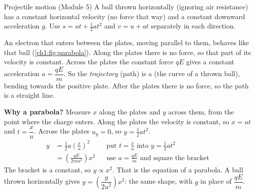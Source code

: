 \begin{keywords}
\end{keywords}

\begin{refresher}{Projectile motion (Module 5)}
A ball thrown horizontally (ignoring air resistance) has a constant horizontal
velocity (no force that way) and a constant downward acceleration $g$. Use
$s = ut + \frac{1}{2}at^2$ and $v = u + at$ separately in each direction.
\end{refresher}

An electron that enters between the plates, moving parallel to them, behaves
like that ball (\cref{ch1:fig:parabola}). Along the plates there is no force, so
that part of its velocity is constant. Across the plates the constant force
$qE$ gives a constant acceleration $a = \dfrac{qE}{m}$. So the \emph{trajectory}
(path) is a  (the curve of a thrown ball), bending towards the
positive plate. After the plates there is no force, so the path is a straight
line.

\textbf{Why a parabola?} Measure $x$ along the plates and $y$ across them, from
the point where the charge enters. Along the plates the velocity is constant,
so $x = ut$ and $t = \dfrac{x}{u}$. Across the plates $u_y = 0$, so
$y = \frac{1}{2}at^2$.
\begin{align*}
  y &= \tfrac{1}{2}a\left(\frac{x}{u}\right)^2 && \text{put $t = \tfrac{x}{u}$ into $y = \tfrac{1}{2}at^2$}\\
    &= \left(\frac{qE}{2mu^2}\right)x^2 && \text{use $a = \tfrac{qE}{m}$ and square the bracket}
\end{align*}
The bracket is a constant, so $y \propto x^2$. That is the equation of a
parabola. A ball thrown horizontally gives $y = \left(\dfrac{g}{2u^2}\right)x^2$:
the same shape, with $g$ in place of $\dfrac{qE}{m}$.

